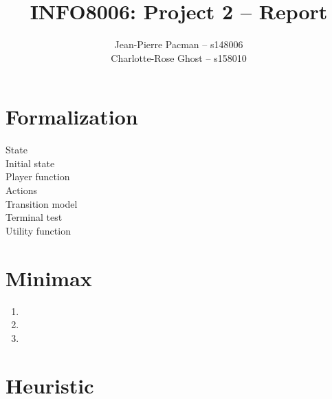 \documentclass{article}
\title{\Large{INFO8006: Project 2 -- Report}}
\author{Jean-Pierre Pacman -- s148006\\Charlotte-Rose Ghost -- s158010}
\begin{document}
\maketitle

\section{Formalization}

\begin{description}
    \item[State]
    \item[Initial state]
    \item[Player function]
    \item[Actions]
    \item[Transition model]
    \item[Terminal test]
    \item[Utility function]
\end{description}

\section{Minimax}

\begin{enumerate}[leftmargin=*, label=\alph*.]
    \item
    \item
    \item
\end{enumerate}

\section{Heuristic}
\end{document}
